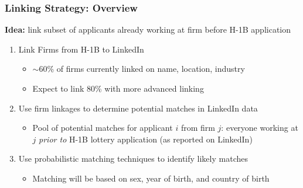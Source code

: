 \documentclass[xcolor=dvipsnames, compress, 12pt, aspectratio=169, handout]{beamer}
\begin{document}
\begin{frame}\label{linking}
    \frametitle{Linking Strategy: Overview}
    \textbf{Idea:} link subset of applicants already working at firm before H-1B application 
    \vspace{3mm}
    \begin{enumerate}
        \item Link Firms from H-1B to LinkedIn
        \begin{itemize}
            \item $\sim$60\% of firms currently linked on name, location, industry 
            \item Expect to link 80\% with more advanced linking
        \end{itemize}
        \vspace{3mm}
        \item Use firm linkages to determine potential matches in LinkedIn data
        \begin{itemize}
            \item Pool of potential matches for applicant $i$ from firm $j$: everyone working at $j$ \textit{prior to} H-1B lottery application (as reported on LinkedIn)
        \end{itemize}
        \vspace{3mm}
        \item Use probabilistic matching techniques to identify likely matches 
        \begin{itemize}
            \item Matching will be based on sex, year of birth, and country of birth
        \end{itemize}
    \end{enumerate}
\end{frame}
\end{document}
